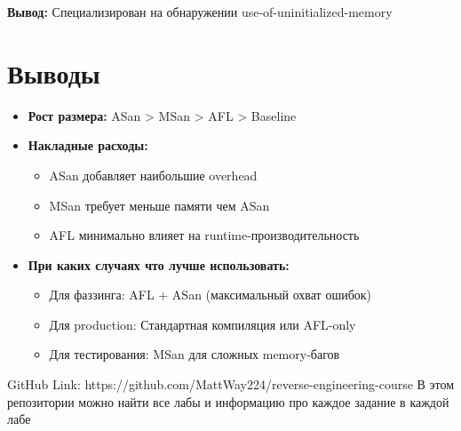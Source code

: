\textbf{Вывод:} Специализирован на обнаружении use-of-uninitialized-memory

\section{Выводы}
\begin{itemize}
\item \textbf{Рост размера:} ASan > MSan > AFL > Baseline
\item \textbf{Накладные расходы:}
  \begin{itemize}
  \item ASan добавляет наибольшие overhead
  \item MSan требует меньше памяти чем ASan
  \item AFL минимально влияет на runtime-производительность
  \end{itemize}
\item \textbf{При каких случаях что лучше использовать:}
  \begin{itemize}
  \item Для фаззинга: AFL + ASan (максимальный охват ошибок)
  \item Для production: Стандартная компиляция или AFL-only
  \item Для тестирования: MSan для сложных memory-багов
  \end{itemize}
\end{itemize}
    \begin{thebibliography}{1}
        GitHub Link: https://github.com/MattWay224/reverse-engineering-course
        В этом репозитории можно найти все лабы и информацию про каждое задание в каждой лабе
    \end{thebibliography}
